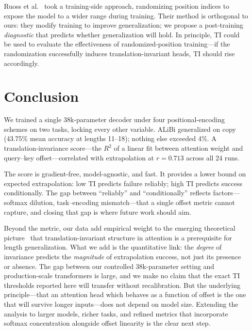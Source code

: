 \documentclass[10pt,twocolumn]{article}
\begin{document}
Ruoss et al.~\cite{ruoss2023randomized} took a training-side approach, randomizing position indices to expose the model to a wider range during training.
Their method is orthogonal to ours: they modify training to improve generalization; we propose a post-training \emph{diagnostic} that predicts whether generalization will hold.
In principle, TI could be used to evaluate the effectiveness of randomized-position training---if the randomization successfully induces translation-invariant heads, TI should rise accordingly.

\section{Conclusion}
\label{sec:conclusion}

We trained a single 38k-parameter decoder under four positional-encoding schemes on two tasks, locking every other variable.
ALiBi generalized on copy (43.75\% mean accuracy at lengths 11--18); nothing else exceeded 4\%.
A translation-invariance score---the $R^2$ of a linear fit between attention weight and query--key offset---correlated with extrapolation at $r = 0.713$ across all 24 runs.

The score is gradient-free, model-agnostic, and fast.
It provides a lower bound on expected extrapolation: low TI predicts failure reliably; high TI predicts success conditionally.
The gap between ``reliably'' and ``conditionally'' reflects factors---softmax dilution, task--encoding mismatch---that a single offset metric cannot capture, and closing that gap is where future work should aim.

Beyond the metric, our data add empirical weight to the emerging theoretical picture~\cite{singh2026relative, gu2026deconstructing} that translation-invariant structure in attention is a prerequisite for length generalization.
What we add is the quantitative link: the \emph{degree} of invariance predicts the \emph{magnitude} of extrapolation success, not just its presence or absence.
The gap between our controlled 38k-parameter setting and production-scale transformers is large, and we make no claim that the exact TI thresholds reported here will transfer without recalibration.
But the underlying principle---that an attention head which behaves as a function of offset is the one that will survive longer inputs---does not depend on model size.
Extending the analysis to larger models, richer tasks, and refined metrics that incorporate softmax concentration alongside offset linearity is the clear next step.
\end{document}
